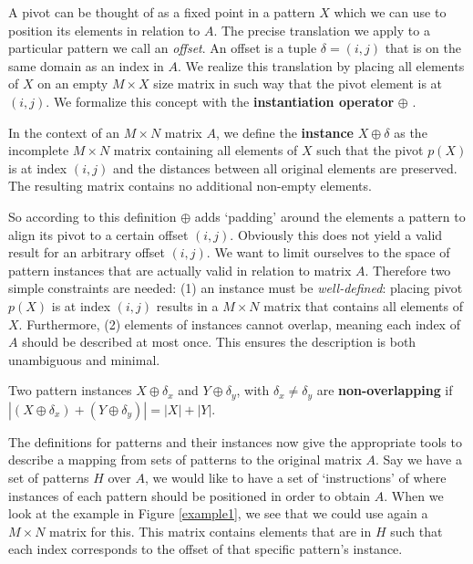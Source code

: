 \documentclass[a4paper,notoc,oneside]{tufte-book}
\begin{document}
A pivot can be thought of as a fixed point in a pattern $X$ which we can use to position its elements in relation to $A$. The precise translation we apply to a particular pattern we call an \emph{offset}. An offset is a tuple $\delta=(i,j)$ that is on the same domain as an index in $A$. We realize this translation by placing all elements of $X$ on an empty $M\times X$ size matrix in such way that the pivot element is at $(i,j)$. We formalize this concept with the \textbf{instantiation operator} $\oplus$ .

\begin{definition}
In the context of an $M\times N$ matrix $A$, we define the \textbf{instance} $X \oplus \delta$ as the incomplete $M\times N$ matrix containing all elements of $X$ such that the pivot $p(X)$ is at index $(i,j)$ and the distances between all original elements are preserved. The resulting matrix contains no additional non-empty elements. 
\end{definition}

So according to this definition $\oplus$ adds `padding' around the elements a pattern to align its pivot to a certain offset $(i,j)$. Obviously this does not yield a valid result for an arbitrary offset $(i,j)$. We want to limit ourselves to the space of pattern instances that are actually valid in relation to matrix $A$. Therefore two simple constraints are needed: (1) an instance must be \emph{well-defined}: placing pivot $p(X)$ is at index $(i,j)$ results in a $M\times N$ matrix that contains all elements of $X$. Furthermore, (2) elements of instances cannot overlap, meaning each index of $A$ should be described at most once. This ensures the description is both unambiguous and minimal.

\begin{definition}
Two pattern instances $X \oplus \delta_x$ and $Y \oplus \delta_y$, with $\delta_x \neq \delta_y$ are \textbf{non-overlapping} if $|(X \oplus \delta_x) + (Y \oplus \delta_y)| = |X|+|Y|$.
\end{definition}

The definitions for patterns and their instances now give the appropriate tools to describe a mapping from sets of patterns to the original matrix $A$. Say we have a set of patterns $H$ over $A$, we would like to have a set of `instructions' of where instances of each pattern should be positioned in order to obtain $A$. When we look at the example in Figure \ref{example1}, we see that we could use again a $M\times N$ matrix for this. This matrix contains elements that are in $H$ such that each index corresponds to the offset of that specific pattern's instance.
\end{document}
